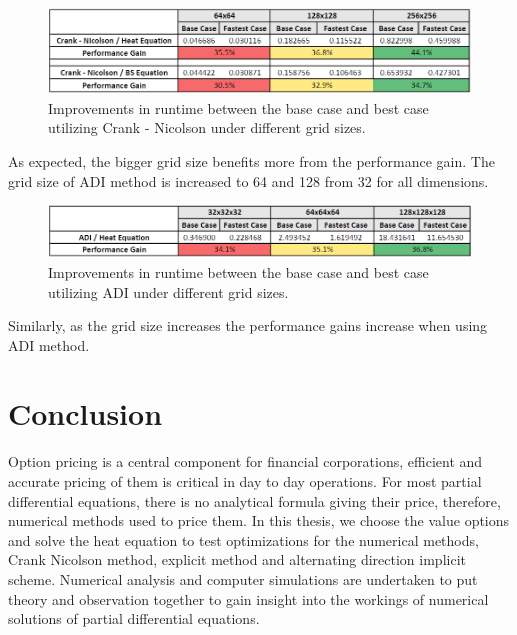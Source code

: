 \documentclass[12pt, oneside]{book}
\theoremstyle{plain}
\theoremstyle{definition}
\begin{document}
 \begin{figure}[!htb]
    \centering
        \includegraphics[scale=0.60]{gridTime.png}
    \caption{Improvements in runtime between the base case and best case utilizing Crank - Nicolson under different grid sizes.}
\end{figure}

As expected, the bigger grid size benefits more from the performance gain. The grid size of ADI method is increased to 64 and 128 from 32 for all dimensions.

 \begin{figure}[!htb]
    \centering
        \includegraphics[scale=0.60]{gridTimeADI.png}
    \caption{Improvements in runtime between the base case and best case utilizing ADI under different grid sizes.}
\end{figure}

Similarly, as the grid size increases the performance gains increase when using ADI method.
\chapter{Conclusion}
Option pricing is a central component for financial corporations, efficient and accurate pricing of them is critical in day to day operations. For most partial differential equations, there is no analytical formula giving their price, therefore, numerical methods used to price them. In this thesis, we choose the value options and solve the heat equation to test optimizations for the numerical methods, Crank Nicolson method, explicit method and alternating direction implicit scheme. Numerical analysis and computer simulations are undertaken to put theory and observation together to gain insight into the workings of numerical solutions of partial differential equations. 
\end{document}
